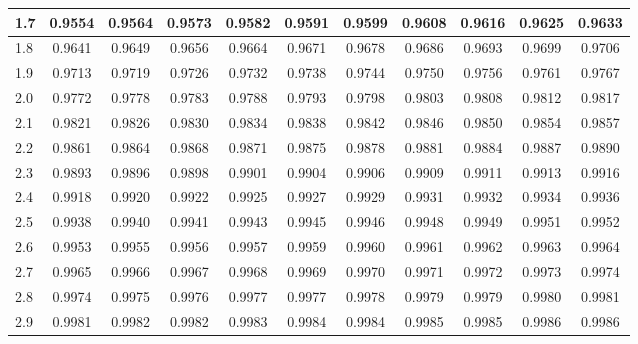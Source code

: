 \documentclass[12pt]{report}
\begin{document}
\begin{tabular}{|l|c|c|c|c|c|c|c|c|c|c|}
1.7 & 0.9554 & 0.9564 & 0.9573 & 0.9582 & 0.9591 & 0.9599 & 0.9608& 0.9616& 0.9625& 0.9633\\
\hline
1.8 & 0.9641 & 0.9649 & 0.9656 & 0.9664 & 0.9671 & 0.9678 & 0.9686& 0.9693& 0.9699& 0.9706\\
\hline
1.9 & 0.9713 & 0.9719 & 0.9726 & 0.9732 & 0.9738 & 0.9744 & 0.9750& 0.9756& 0.9761& 0.9767\\
\hline
2.0 & 0.9772 & 0.9778 & 0.9783 & 0.9788 & 0.9793 & 0.9798 & 0.9803& 0.9808& 0.9812& 0.9817\\
\hline
2.1 & 0.9821 & 0.9826 & 0.9830 & 0.9834 & 0.9838 & 0.9842 & 0.9846& 0.9850& 0.9854& 0.9857\\
\hline
2.2 & 0.9861 & 0.9864 & 0.9868 & 0.9871 & 0.9875 & 0.9878 & 0.9881& 0.9884& 0.9887& 0.9890\\
\hline
2.3 & 0.9893 & 0.9896 & 0.9898 & 0.9901 & 0.9904 & 0.9906 & 0.9909& 0.9911& 0.9913& 0.9916\\
\hline
2.4 & 0.9918 & 0.9920 & 0.9922 & 0.9925 & 0.9927 & 0.9929 & 0.9931& 0.9932& 0.9934& 0.9936\\
\hline
2.5 & 0.9938 & 0.9940 & 0.9941 & 0.9943 & 0.9945 & 0.9946 & 0.9948& 0.9949& 0.9951& 0.9952\\
\hline
2.6 & 0.9953 & 0.9955 & 0.9956 & 0.9957 & 0.9959 & 0.9960 & 0.9961& 0.9962& 0.9963& 0.9964\\
\hline
2.7 & 0.9965 & 0.9966 & 0.9967 & 0.9968 & 0.9969 & 0.9970 & 0.9971& 0.9972& 0.9973& 0.9974\\
\hline
2.8 & 0.9974 & 0.9975 & 0.9976 & 0.9977 & 0.9977 & 0.9978 & 0.9979& 0.9979& 0.9980& 0.9981\\
\hline
2.9  &0.9981  &0.9982  &0.9982  &0.9983  &0.9984  &0.9984  &0.9985 &0.9985 &0.9986 &0.9986 \\
\hline
\end{tabular}
\end{document}
